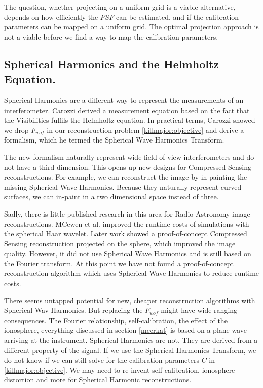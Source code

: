 The question, whether projecting on a uniform grid is a viable alternative, depends on how efficiently the $PSF$ can be estimated, and if the calibration parameters can be mapped on a uniform grid. The optimal projection approach is not a viable before we find a way to map the calibration parameters.


\subsection{Spherical Harmonics and the Helmholtz Equation.}
Spherical Harmonics are a different way to represent the measurements of an interferometer. Carozzi\cite{carozzi2015imaging} derived a measurement equation based on the fact that the Visibilities fulfils the Helmholtz equation. In practical terms, Carozzi showed we drop $F_{wof}$ in our reconstruction problem \eqref{killmajor:objective} and derive a formalism, which he termed the Spherical Wave Harmonics Transform. 

The new formalism naturally represent wide field of view interferometers and do not have a third dimension. This opens up new designs for Compressed Sensing reconstructions. For example, we can reconstruct the image by in-painting the missing Spherical Wave Harmonics. Because they naturally represent curved surfaces, we can in-paint in a two dimensional space instead of three.

Sadly, there is little published research in this area for Radio Astronomy image reconstructions. MCewen et al.\cite{mcewen2008simulating} improved the runtime costs of simulations with the spherical Haar wavelet. Later work\cite{mcewen2011compressed} showed a proof-of-concept Compressed Sensing reconstruction projected on the sphere, which improved the image quality. However, it did not use Spherical Wave Harmonics and \cite{mcewen2011compressed} is still based on the Fourier transform. At this point we have not found a proof-of-concept reconstruction algorithm which uses Spherical Wave Harmonics to reduce runtime costs. 

There seems untapped potential for new, cheaper reconstruction algorithms with Spherical Wav Harmonics. But replacing the $F_{wof}$ might have wide-ranging consequences. The Fourier relationship, self-calibration, the effect of the ionosphere, everything discussed in section \ref{meerkat} is based on a plane wave arriving at the instrument\cite{thompson1986interferometry, smirnov2011revisiting}. Spherical Harmonics are not. They are derived from a different property of the signal. If we use the Spherical Harmonics Transform, we do not know if we can still solve for the calibration parameters $C$ in \eqref{killmajor:objective}. We may need to re-invent self-calibration, ionosphere distortion and more for Spherical Harmonic reconstructions.


